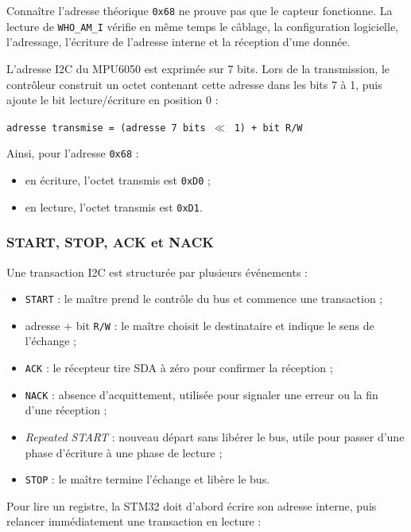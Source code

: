\documentclass[11pt,a4paper]{article}
\begin{document}
	Connaître l'adresse théorique \texttt{0x68} ne prouve pas que le capteur fonctionne. La lecture de \texttt{WHO\_AM\_I} vérifie en même temps le câblage, la configuration logicielle, l'adressage, l'écriture de l'adresse interne et la réception d'une donnée.
	
	L'adresse I2C du MPU6050 est exprimée sur 7 bits. Lors de la transmission, le contrôleur construit un octet contenant cette adresse dans les bits 7 à 1, puis ajoute le bit lecture/écriture en position 0 :
	
	\begin{center}
		\texttt{adresse transmise = (adresse 7 bits $\ll$ 1) + bit R/W}
	\end{center}
	
	Ainsi, pour l'adresse \texttt{0x68} :
	
	\begin{itemize}
		\item en écriture, l'octet transmis est \texttt{0xD0} ;
		\item en lecture, l'octet transmis est \texttt{0xD1}.
	\end{itemize}
	
	\subsubsection*{START, STOP, ACK et NACK}
	
	Une transaction I2C est structurée par plusieurs événements :
	
	\begin{itemize}
		\item \texttt{START} : le maître prend le contrôle du bus et commence une transaction ;
		\item adresse + bit \texttt{R/W} : le maître choisit le destinataire et indique le sens de l'échange ;
		\item \texttt{ACK} : le récepteur tire SDA à zéro pour confirmer la réception ;
		\item \texttt{NACK} : absence d'acquittement, utilisée pour signaler une erreur ou la fin d'une réception ;
		\item \textit{Repeated START} : nouveau départ sans libérer le bus, utile pour passer d'une phase d'écriture à une phase de lecture ;
		\item \texttt{STOP} : le maître termine l'échange et libère le bus.
	\end{itemize}
	
	Pour lire un registre, la STM32 doit d'abord écrire son adresse interne, puis relancer immédiatement une transaction en lecture :
	
\end{document}
